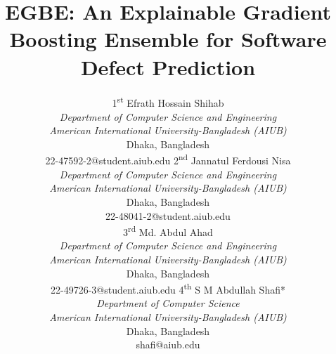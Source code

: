 \documentclass[conference]{IEEEtran}
\begin{document}
\title{EGBE: An Explainable Gradient Boosting Ensemble for Software Defect Prediction}

\author{%
\begin{tabular}{@{}c@{\hspace{1.2cm}}c@{}}

\shortstack[c]{
1\textsuperscript{st} Efrath Hossain Shihab\\
\textit{Department of Computer Science and Engineering}\\
\textit{American International University-Bangladesh (AIUB)}\\
Dhaka, Bangladesh\\
22-47592-2@student.aiub.edu
}
&
\shortstack[c]{
2\textsuperscript{nd} Jannatul Ferdousi Nisa\\
\textit{Department of Computer Science and Engineering}\\
\textit{American International University-Bangladesh (AIUB)}\\
Dhaka, Bangladesh\\
22-48041-2@student.aiub.edu
}

\\[1.2em]

\shortstack[c]{
3\textsuperscript{rd} Md. Abdul Ahad\\
\textit{Department of Computer Science and Engineering}\\
\textit{American International University-Bangladesh (AIUB)}\\
Dhaka, Bangladesh\\
22-49726-3@student.aiub.edu
}
&
\shortstack[c]{
4\textsuperscript{th} S M Abdullah Shafi*\\
\textit{Department of Computer Science}\\
\textit{American International University-Bangladesh (AIUB)}\\
Dhaka, Bangladesh\\
shafi@aiub.edu
}

\end{tabular}%
}
\maketitle
\end{document}

